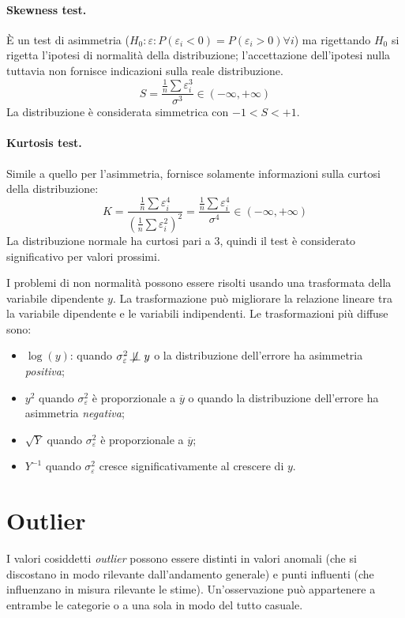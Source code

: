 \documentclass[a4page, 11pt]{article} %
\def\dep{\not\!\perp\!\!\!\perp}  %
\begin{document}
\paragraph{Skewness test.} È un test di asimmetria ($H_0 : \varepsilon : P(\varepsilon_i < 0) = P(\varepsilon_i > 0) \forall i$) ma rigettando $H_0$ si rigetta l'ipotesi di normalità della distribuzione; l'accettazione dell'ipotesi nulla tuttavia non fornisce indicazioni sulla reale distribuzione.
\begin{equation*}
  S = \frac{\frac{1}{n}\sum\varepsilon_i^3}{\sigma^3} \in (-\infty, +\infty)
\end{equation*}
La distribuzione è considerata simmetrica con $-1 < S < +1$.
\paragraph{Kurtosis test.} Simile a quello per l'asimmetria, fornisce solamente informazioni sulla curtosi della distribuzione:
\begin{equation*}
  K = \frac{\frac{1}{n}\sum\varepsilon_i^4}{(\frac{1}{n}\sum\varepsilon_i^2)^2} = \frac{\frac{1}{n}\sum\varepsilon_i^4}{\sigma^4} \in (-\infty, +\infty)
\end{equation*}
La distribuzione normale ha curtosi pari a $3$, quindi il test è considerato significativo per valori prossimi. \newline

I problemi di non normalità possono essere risolti usando una trasformata della variabile dipendente $y$.
La trasformazione può migliorare la relazione lineare tra la variabile dipendente e le variabili indipendenti.
Le trasformazioni più diffuse sono:
\begin{itemize}[noitemsep]
  \item $\log(y)$: quando $\sigma^2_\varepsilon \dep y$ o la distribuzione dell'errore ha asimmetria \textit{positiva};
  \item $y^2$ quando $\sigma^2_\varepsilon$ è proporzionale a $\overline{y}$ o quando la distribuzione dell'errore ha asimmetria \textit{negativa};
  \item $\sqrt{Y}$ quando $\sigma^2_\varepsilon$ è proporzionale a $\overline{y}$;
  \item $Y^{-1}$ quando $\sigma^2_\varepsilon$ cresce significativamente al crescere di $y$.
\end{itemize}

\section{Outlier}
I valori cosiddetti \textit{outlier} possono essere distinti in valori anomali (che si discostano in modo rilevante dall’andamento generale) e punti influenti (che influenzano in misura rilevante le stime).
Un'osservazione può appartenere a entrambe le categorie o a una sola in modo del tutto casuale.
\end{document}
